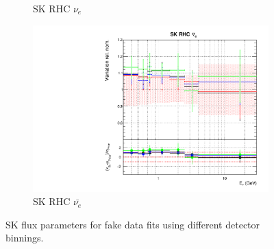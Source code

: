 \begin{figure}[!htbp]
\begin{subfigure}{0.45\textwidth}
  \caption{SK RHC $\nu_e$}
\end{subfigure}
\begin{subfigure}{0.45\textwidth}
  \centering
  \includegraphics[width=0.75\linewidth]{figs/detcovbinflux_15}
  \caption{SK RHC $\bar{\nu_e}$}
\end{subfigure}
\caption{SK flux parameters for fake data fits using different detector binnings.}
\label{fig:detcovbinfluxSK}
\end{figure}


